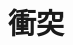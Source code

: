 \documentclass[../../all/physics-standard_answers_all.tex]{subfiles}
\begin{document}
\section{衝突}
\end{document}

